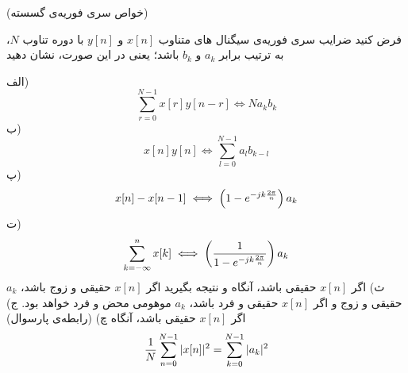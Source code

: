 \documentclass[10pt,letterpaper]{article}
\newcommand{\nl}{\newline\newline}
\newcounter{QuestionNumber}
\newcommand{\Q}{
\textbf{
سوال \theQuestionNumber)
}
\stepcounter{QuestionNumber}
}
\newcommand{\fig}[3]{
\begin{figure}[h!]
#1
\caption{#2}
\label{#3}
\end{figure}
}
\newcommand{\subfig}[3]{
\begin{subfigure}{#3}
#1
\caption{#2}
\end{subfigure}
}
\begin{document}
(خواص سری فوریه‌ی گسسته)

فرض کنید ضرایب سری فوریه‌ی سیگنال های متناوب  $x[n]$ و $y[n]$ با دوره تناوب $N$، به ترتیب برابر $a_k$ و $b_k$ باشد؛ یعنی
 در این صورت، نشان دهید

الف)
$$
\sum_{r=0}^{N-1}x[r]y[n-r]\iff Na_kb_k
$$
ب)
$$
x[n]y[n]\iff \sum_{l=0}^{N-1}a_lb_{k-l}
$$
پ) 
$$
x[n]-x[n-1]\iff \left(1-e^{-jk{2\pi\over n}}\right)a_k
$$
ت)
$$
\sum_{k=-\infty}^n x[k]\iff \left({1\over 1-e^{-jk{2\pi\over n}}}\right)a_k
$$
ث) اگر 
$
x[n]
$
 حقیقی باشد، آنگاه
و نتیجه بگیرید اگر $x[n]$ حقیقی و زوج باشد، 
$
a_k
$
 حقیقی و زوج و اگر 
$
x[n]
$
 حقیقی و فرد باشد، 
$
a_k
$
 موهومی محض و فرد خواهد بود.
\nl
ج) اگر 
$
x[n]
$
 حقیقی باشد، آنگاه
چ) (رابطه‌ی پارسوال)
$$
{1\over N}\sum_{n=0}^{N-1} |x[n]|^2=\sum_{k=0}^{N-1} |a_k|^2
$$
%
%
\end{document}
